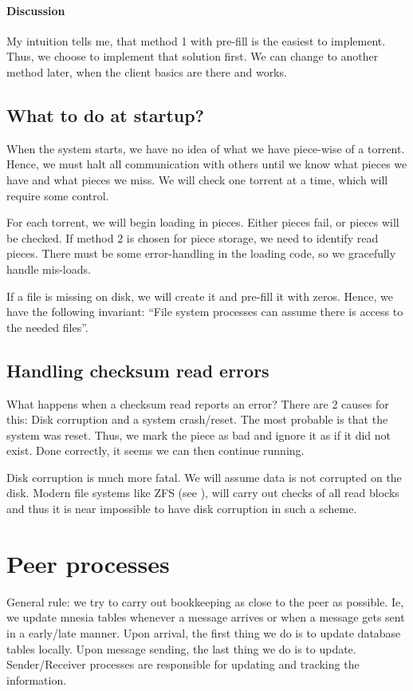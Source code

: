 \documentclass[a4paper]{memoir}
\begin{document}
\paragraph{Discussion}
My intuition tells me, that method 1 with pre-fill is the easiest to
implement. Thus, we choose to implement that solution first. We can
change to another method later, when the client basics are there and
works.

\subsection{What to do at startup?}
When the system starts, we have no idea of what we have piece-wise of
a torrent. Hence, we must halt all communication with others until we
know what pieces we have and what pieces we miss. We will check one
torrent at a time, which will require some control.

For each torrent, we will begin loading in pieces. Either pieces fail,
or pieces will be checked. If method 2 is chosen for piece storage, we
need to identify read pieces. There must be some error-handling in the
loading code, so we gracefully handle mis-loads.

If a file is missing on disk, we will create it and pre-fill it with
zeros. Hence, we have the following invariant: ``File system processes
can assume there is access to the needed files''.

\subsection{Handling checksum read errors}
What happens when a checksum read reports an error? There are 2 causes
for this: Disk corruption and a system crash/reset. The most probable
is that the system was reset. Thus, we mark the piece as bad and
ignore it as if it did not exist. Done correctly, it seems we can then
continue running.

Disk corruption is much more fatal. We will assume data is not
corrupted on the disk. Modern file systems like ZFS (see \cite{zfs}),
will carry out checks of all read blocks and thus it is near
impossible to have disk corruption in such a scheme.

\section{Peer processes}

General rule: we try to carry out bookkeeping as close to the peer as
possible. Ie, we update mnesia tables whenever a message arrives or
when a message gets sent in a early/late manner. Upon arrival, the
first thing we do is to update database tables locally. Upon message
sending, the last thing we do is to update. Sender/Receiver processes
are responsible for updating and tracking the information.
\end{document}

